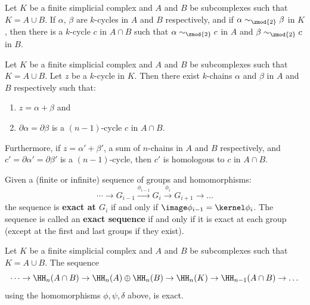 \begin{problem}[16.33]
  Let $K$ be a finite simplicial complex and $A$ and $B$ be
  subcomplexes such that $K=A\cup B$. If $\alpha$, $\beta$ are
  $k$-cycles in $A$ and $B$ respectively, and if $\alpha
  \sim_{\zmod{2}} \beta$ in $K$, then there is a $k$-cycle $c$ in
  $A\cap B$ such that $\alpha \sim_{\zmod{2}} c$ in $A$ and $\beta
  \sim_{\zmod{2}} c$ in $B$.
\end{problem}
\begin{solution}

\end{solution}

\begin{problem}[16.34]
  Let $K$ be a finite simplicial complex and $A$ and $B$ be
  subcomplexes such that  $K=A\cup B$. Let $z$ be a $k$-cycle in $K$.
  Then there exist $k$-chains $\alpha$ and $\beta$ in $A$ and $B$
  respectively such that:
  \begin{enumerate}[label=(\arabic*)]
    \item $z=\alpha+\beta$ and
    \item $\partial \alpha=\partial \beta$ is a $(n-1)$-cycle $c$ in
      $A\cap B$.
  \end{enumerate}
  Furthermore, if $z= \alpha'+\beta'$, a sum of $n$-chains in $A$ and
  $B$ respectively, and $c'= \partial \alpha' = \partial \beta'$ is a
  $(n-1)$-cycle, then $c'$ is homologous to $c$ in $A \cap B$.
\end{problem}

\begin{solution}

\end{solution}

\begin{definition}
  Given a (finite or infinite) sequence of groups and homomorphisms:
  \[
    \cdots \to
    G_{i-1}\stackrel{\phi_{i-1}}{\longrightarrow}G_{i}\stackrel{\phi_i}{\longrightarrow}G_{i+1}
    \to \dots
  \]
  the sequence is \textbf{exact at $G_i$} if and only if $\image
  \phi_{i-1}=\kernel \phi_{i}$. The sequence is called an
  \textbf{exact sequence} if and only if it is exact at each group
  (except at the first and last groups if they exist).
\end{definition}


\begin{problem}
  Let $K$ be a finite simplicial complex and $A$ and $B$ be
  subcomplexes such that $K=A\cup B$. The sequence
  \[
    \dots \to \HH_n(A\cap B) \to \HH_n(A)\oplus \HH_n(B) \to \HH_n(K)
    \to \HH_{n-1}(A\cap B) \to \dots
  \]
  using the homomorphisms $\phi,\psi,\delta$ above, is exact.
\end{problem}



